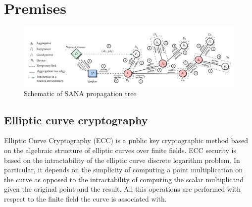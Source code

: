 \section{Premises}

\begin{figure}
	\includegraphics[width=0.9\linewidth]{Images/SANA_general.png} %
	\caption{Schematic of SANA propagation tree} %
\end{figure}

\subsection{Elliptic curve cryptography}
Elliptic Curve Cryptography (ECC)  is a public key
cryptographic method based on the algebraic structure of elliptic curves over
finite fields.
ECC security is based on the intractability of the elliptic
curve discrete logarithm problem.
In particular, it depends on the simplicity of computing a point multiplication 
on the curve as opposed to the intractability of computing the scalar multiplicand
given the original point and the result.
All this operations are performed with respect to the finite field the curve is associated with.

